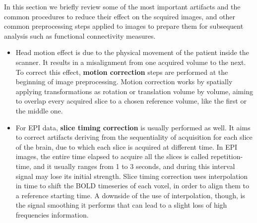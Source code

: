 \documentclass[11pt]{report}
\begin{document}

In this section we briefly review some of the most important artifacts and the common procedures to reduce their effect on the scquired images, and other common preprocessing steps applied to images to prepare them for subsequent analysis such as functional connectivity measures.
\begin{itemize}
\item Head motion effect is due to the physical movement of the patient inside the scanner. It results in a misalignment from one acquired volume to the next.
To correct this effect, \textbf{motion correction} steps are performed at the beginning of image preprocessing. Motion correction works by spatially applying transformations as rotation or translation volume by volume, aiming to overlap every acquired slice to a chosen reference volume, like the first or the middle one.

\item For EPI data, \textbf{slice timing correction} is usually performed as well. It aims to correct artifacts deriving from the sequentiality of acquisition for each slice of the brain, due to which each slice is acquired at different time.
In EPI images, the entire time elapsed to acquire all the slices is called repetition-time, and it usually ranges from 1 to 3 seconds, and during this interval signal may lose its initial strength.
Slice timing correction uses interpolation in time to shift the BOLD timeseries of each voxel, in order to align them to a reference starting time.
A downside of the use of interpolation, though, is the signal smoothing it performs that can lead to a slight loss of high frequencies information.


\end{itemize}
\end{document}
